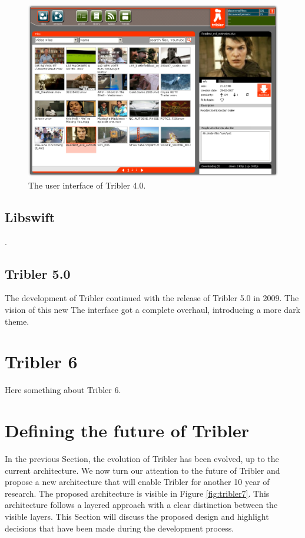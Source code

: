 \begin{figure}[t]
	\centering
	\includegraphics[width=0.8\columnwidth]{images/tribler4}
	\caption{The user interface of Tribler 4.0.}
	\label{fig:tribler4}
\end{figure}

\subsection{Libswift}
.

\subsection{Tribler 5.0}
The development of Tribler continued with the release of Tribler 5.0 in 2009. The vision of this new  The interface got a complete overhaul, introducing a more dark theme.

\section{Tribler 6}
Here something about Tribler 6.

\section{Defining the future of Tribler}
In the previous Section, the evolution of Tribler has been evolved, up to the current architecture. We now turn our attention to the future of Tribler and propose a new architecture that will enable Tribler for another 10 year of research. The proposed architecture is visible in Figure \ref{fig:tribler7}. This architecture follows a layered approach with a clear distinction between the visible layers. This Section will discuss the proposed design and highlight decisions that have been made during the development process.

